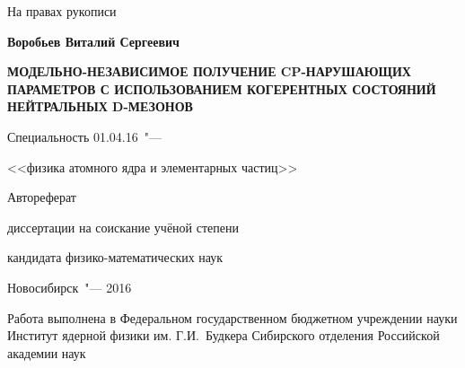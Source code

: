 \documentclass[a4paper,14pt]{extarticle} %
\begin{document}
\thispagestyle{empty}
\fontsize{14pt}{15pt}\selectfont

\vspace{0pt plus1fill} %
\begin{flushright}
  \large{На правах рукописи}
\end{flushright}

\vspace{0pt plus3fill} %
\begin{center}
\textbf{\large Воробьев Виталий Сергеевич}
\end{center}

\vspace{0pt plus3fill} %
\begin{center}
\textbf {\Large \MakeUppercase{Модельно-независимое получение CP-нарушающих параметров с использованием когерентных состояний нейтральных D-мезонов}}

\vspace{0pt plus3fill} %
{\large Специальность 01.04.16\ "---\par <<физика атомного ядра и элементарных частиц>>}

\vspace{0pt plus1.5fill} %
\Large{Автореферат}\par
\large{диссертации на соискание учёной степени\par кандидата физико-математических наук}
\end{center}

\vspace{0pt plus4fill} %
\begin{center}
{\large{Новосибирск\ "--- 2016}}
\end{center}

\newpage
\noindent Работа выполнена в Федеральном государственном бюджетном учреждении науки Институт ядерной физики им. Г.И.~Будкера Сибирского отделения Российской академии наук
\end{document}
